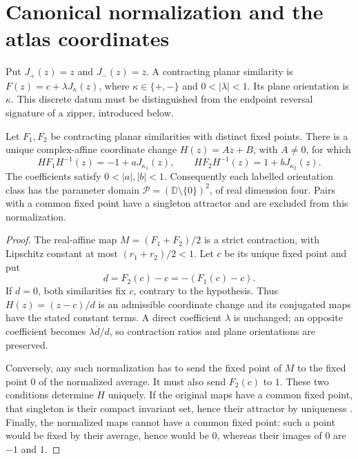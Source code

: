 \providecommand{\C}{\mathbb C}
\providecommand{\D}{\mathbb D}
\providecommand{\cK}{\mathcal K}
\providecommand{\cM}{\mathcal M}
\providecommand{\cW}{\mathcal W}
\providecommand{\dist}{\operatorname{dist}}
\providecommand{\diam}{\operatorname{diam}}
\providecommand{\Fix}{\operatorname{Fix}}
\providecommand{\Ker}{\operatorname{ker}}

\section{Canonical normalization and the atlas coordinates}
\label{sec:core-normalization}

Put $J_+(z)=z$ and $J_-(z)=\overline z$. A contracting planar
similarity is $F(z)=c+\lambda J_\kappa(z)$, where
$\kappa\in\{+,-\}$ and $0<|\lambda|<1$. Its plane orientation is
$\kappa$. This discrete datum must be distinguished from the endpoint
reversal signature of a zipper, introduced below.

\begin{proposition}
\label{prop:canonical-normalization}
Let $F_1,F_2$ be contracting planar similarities with distinct fixed
points. There is a unique complex-affine coordinate change
$H(z)=Az+B$, with $A\ne0$, for which
\begin{equation}\label{eq:canonical-system}
H F_1 H^{-1}(z)=-1+aJ_{\kappa_1}(z),\qquad
H F_2 H^{-1}(z)=1+bJ_{\kappa_2}(z).
\end{equation}
The coefficients satisfy $0<|a|,|b|<1$. Consequently each labelled
orientation class has the parameter domain
$\mathcal P=(\D\setminus\{0\})^2$, of real dimension four.
Pairs with a common fixed point have a singleton attractor and are
excluded from this normalization.
\end{proposition}

\begin{proof}
The real-affine map $M=(F_1+F_2)/2$ is a strict contraction, with
Lipschitz constant at most $(r_1+r_2)/2<1$. Let $c$ be its unique
fixed point and put
\[
d=F_2(c)-c=-(F_1(c)-c).
\]
If $d=0$, both similarities fix $c$, contrary to the hypothesis.
Thus $H(z)=(z-c)/d$ is an admissible coordinate change and its
conjugated maps have the stated constant terms. A direct coefficient
$\lambda$ is unchanged; an opposite coefficient becomes
$\lambda\overline d/d$, so contraction ratios and plane orientations
are preserved.

Conversely, any such normalization has to send the fixed point of
$M$ to the fixed point $0$ of the normalized average. It must also
send $F_2(c)$ to $1$. These two conditions determine $H$ uniquely.
If the original maps have a common fixed point, that singleton is
their compact invariant set, hence their attractor by uniqueness
\cite{Hutchinson1981}. Finally, the normalized maps cannot have a
common fixed point: such a point would be fixed by their average,
hence would be $0$, whereas their images of $0$ are $-1$ and $1$.
\end{proof}

